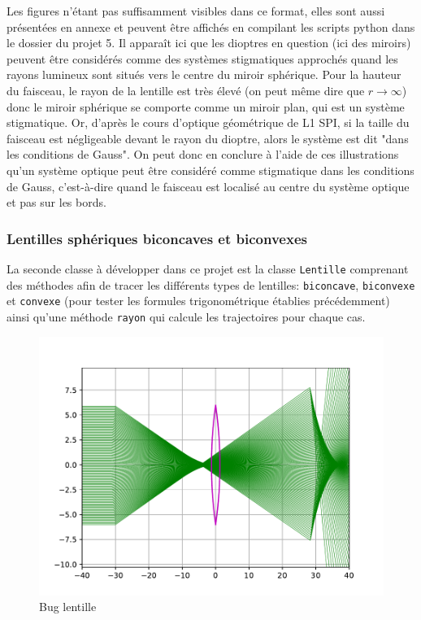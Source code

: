 \documentclass[a4paper,11pt]{article}
\begin{document}
Les figures n'étant pas suffisamment visibles dans ce format, elles sont aussi présentées en annexe et peuvent être affichés en compilant les scripts python dans le dossier du projet 5. Il apparaît ici que les dioptres en question (ici des miroirs) peuvent être considérés comme des systèmes stigmatiques approchés quand les rayons lumineux sont situés vers le centre du miroir sphérique. Pour la hauteur du faisceau, le rayon de la lentille est très élevé (on peut même dire que $r \longrightarrow \infty$) donc le miroir sphérique se comporte comme un miroir plan, qui est un système stigmatique. Or, d'après le cours d'optique géométrique de L1 SPI, si la taille du faisceau est négligeable devant le rayon du dioptre, alors le système est dit "dans les conditions de Gauss". On peut donc en conclure à l'aide de ces illustrations qu'un système optique peut être considéré comme stigmatique dans les conditions de Gauss, c'est-à-dire quand le faisceau est localisé au centre du système optique et pas sur les bords.


\subsubsection{Lentilles sphériques biconcaves et biconvexes}
La seconde classe à développer dans ce projet est la classe \verb|Lentille| comprenant des méthodes afin de tracer les différents types de lentilles: \verb|biconcave|, \verb|biconvexe| et \verb|convexe| (pour tester les formules trigonométrique établies précédemment) ainsi qu'une méthode \verb|rayon| qui calcule les trajectoires pour chaque cas.

\begin{figure}[H]
	\centering
	\includegraphics[scale=0.6]{Figures/bug_lentille.pdf}
	\caption{Bug lentille}
	\label{fig:bug_lentille}
\end{figure}
\end{document}
